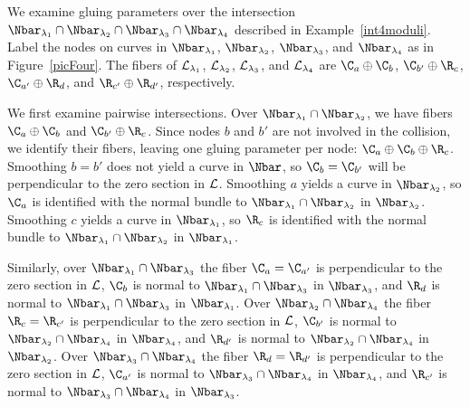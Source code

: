 \begin{example} \label{int4glue}
We examine gluing parameters over the intersection $\Nbar_{\lambda_1} \cap \Nbar_{\lambda_2} \cap \Nbar_{\lambda_3} \cap \Nbar_{\lambda_4}$ described in Example~\ref{int4moduli}. Label the nodes on curves in $\Nbar_{\lambda_1}$, $\Nbar_{\lambda_2}$, $\Nbar_{\lambda_3}$, and $\Nbar_{\lambda_4}$ as in Figure~\ref{picFour}. The fibers of $\mathcal{L}_{\lambda_1}$, $\mathcal{L}_{\lambda_2}$, $\mathcal{L}_{\lambda_3}$, and $\mathcal{L}_{\lambda_4}$ are $\C_a \oplus \C_b$, $\C_{b'} \oplus \R_c$, $\C_{a'} \oplus \R_d$, and $\R_{c'} \oplus \R_{d'}$, respectively.

We first examine pairwise intersections. Over $\Nbar_{\lambda_1} \cap \Nbar_{\lambda_2}$, we have fibers $\C_a \oplus \C_b$ and $\C_{b'} \oplus \R_c$. Since nodes $b$ and $b'$ are not involved in the collision, we identify their fibers, leaving one gluing parameter per node: $\C_a \oplus \C_b \oplus \R_c$. Smoothing $b=b'$ does not yield a curve in $\Nbar$, so $\C_b=\C_{b'}$ will be perpendicular to the zero section in $\mathcal{L}$. Smoothing $a$ yields a curve in $\Nbar_{\lambda_2}$, so $\C_a$ is identified with the normal bundle to $\Nbar_{\lambda_1} \cap \Nbar_{\lambda_2}$ in $\Nbar_{\lambda_2}$. Smoothing $c$ yields a curve in $\Nbar_{\lambda_1}$, so $\R_c$ is identified with the normal bundle to $\Nbar_{\lambda_1} \cap \Nbar_{\lambda_2}$ in $\Nbar_{\lambda_1}$.

Similarly, over $\Nbar_{\lambda_1} \cap \Nbar_{\lambda_3}$ the fiber $\C_a=\C_{a'}$ is perpendicular to the zero section in $\mathcal{L}$, $\C_b$ is normal to $\Nbar_{\lambda_1} \cap \Nbar_{\lambda_3}$ in $\Nbar_{\lambda_3}$, and $\R_d$ is normal to $\Nbar_{\lambda_1} \cap \Nbar_{\lambda_3}$ in $\Nbar_{\lambda_1}$. Over $\Nbar_{\lambda_2} \cap \Nbar_{\lambda_4}$ the fiber $\R_c=\R_{c'}$ is perpendicular to the zero section in $\mathcal{L}$, $\C_{b'}$ is normal to $\Nbar_{\lambda_2} \cap \Nbar_{\lambda_4}$ in $\Nbar_{\lambda_4}$, and $\R_{d'}$ is normal to $\Nbar_{\lambda_2} \cap \Nbar_{\lambda_4}$ in $\Nbar_{\lambda_2}$. Over $\Nbar_{\lambda_3} \cap \Nbar_{\lambda_4}$ the fiber $\R_d=\R_{d'}$ is perpendicular to the zero section in $\mathcal{L}$, $\C_{a'}$ is normal to $\Nbar_{\lambda_3} \cap \Nbar_{\lambda_4}$ in $\Nbar_{\lambda_4}$, and $\R_{c'}$ is normal to $\Nbar_{\lambda_3} \cap \Nbar_{\lambda_4}$ in $\Nbar_{\lambda_3}$.



\end{example}
